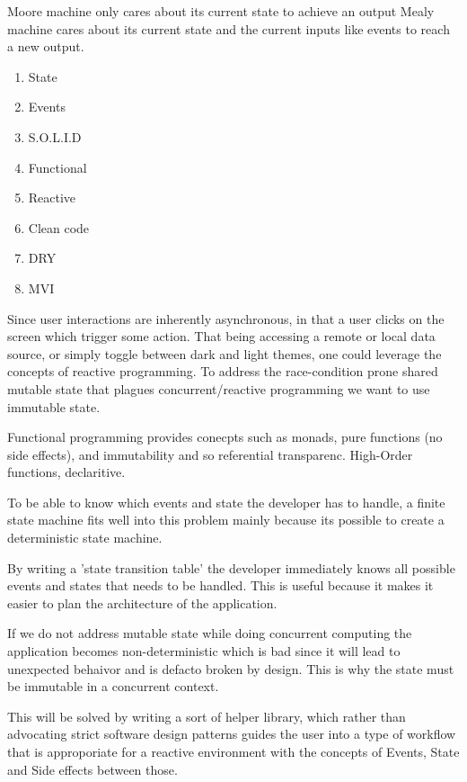 Moore machine only cares about its current state to achieve an output
Mealy machine cares about its current state and the current inputs like events to reach
a new output.

\begin{enumerate}

    \item State
    \item Events
    \item S.O.L.I.D
    \item Functional 
    \item Reactive
    \item Clean code
    \item DRY
    \item MVI

\end{enumerate}

Since user interactions are inherently asynchronous, in that a user clicks on the screen which trigger some action. 
That being accessing a remote or local data source, or simply toggle between dark and light themes, one could leverage the concepts of reactive programming.
To address the race-condition prone shared mutable state that plagues concurrent/reactive programming we want to use immutable state.

Functional programming provides conecpts such as monads, pure functions (no side effects), and immutability and so referential transparenc.
High-Order functions, declaritive.

To be able to know which events and state the developer has to handle, a finite state machine \cite{fsmWikiPage} fits well into 
this problem mainly because its possible to create a deterministic state machine.

By writing a 'state transition table' the developer immediately knows all possible events and states that needs to be handled.
This is useful because it makes it easier to plan the architecture of the application.

If we do not address mutable state while doing concurrent computing the application becomes non-deterministic
which is bad since it will lead to unexpected behaivor and is defacto broken by design. 
This is why the state must be immutable in a concurrent context.

This will be solved by writing a sort of helper library, which rather than advocating strict software design patterns
guides the user into a type of workflow that is approporiate for a reactive environment with the concepts
of Events, State and Side effects between those.

